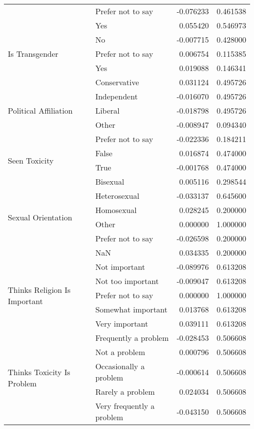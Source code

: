 \begin{longtable}{llrr}
 & Prefer not to say & -0.076233 & 0.461538 \\
 & Yes & 0.055420 & 0.546973 \\
\cline{1-4}
\multirow[t]{3}{*}{Is Transgender} & No & -0.007715 & 0.428000 \\
 & Prefer not to say & 0.006754 & 0.115385 \\
 & Yes & 0.019088 & 0.146341 \\
\cline{1-4}
\multirow[t]{5}{*}{Political Affiliation} & Conservative & 0.031124 & 0.495726 \\
 & Independent & -0.016070 & 0.495726 \\
 & Liberal & -0.018798 & 0.495726 \\
 & Other & -0.008947 & 0.094340 \\
 & Prefer not to say & -0.022336 & 0.184211 \\
\cline{1-4}
\multirow[t]{2}{*}{Seen Toxicity} & False & 0.016874 & 0.474000 \\
 & True & -0.001768 & 0.474000 \\
\cline{1-4}
\multirow[t]{6}{*}{Sexual Orientation} & Bisexual & 0.005116 & 0.298544 \\
 & Heterosexual & -0.033137 & 0.645600 \\
 & Homosexual & 0.028245 & 0.200000 \\
 & Other & 0.000000 & 1.000000 \\
 & Prefer not to say & -0.026598 & 0.200000 \\
 & NaN & 0.034335 & 0.200000 \\
\cline{1-4}
\multirow[t]{5}{*}{Thinks Religion Is Important} & Not important & -0.089976 & 0.613208 \\
 & Not too important & -0.009047 & 0.613208 \\
 & Prefer not to say & 0.000000 & 1.000000 \\
 & Somewhat important & 0.013768 & 0.613208 \\
 & Very important & 0.039111 & 0.613208 \\
\cline{1-4}
\multirow[t]{5}{*}{Thinks Toxicity Is Problem} & Frequently a problem & -0.028453 & 0.506608 \\
 & Not a problem & 0.000796 & 0.506608 \\
 & Occasionally a problem & -0.000614 & 0.506608 \\
 & Rarely a problem & 0.024034 & 0.506608 \\
 & Very frequently a problem & -0.043150 & 0.506608 \\
\cline{1-4}
\end{longtable}
